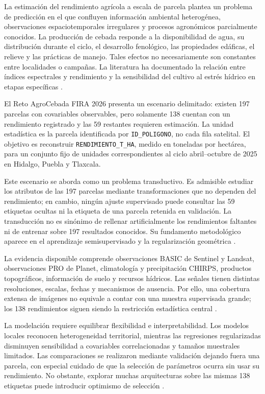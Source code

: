 La estimación del rendimiento agrícola a escala de parcela plantea un problema de predicción en el que confluyen información ambiental heterogénea, observaciones espaciotemporales irregulares y procesos agronómicos parcialmente conocidos. La producción de cebada responde a la disponibilidad de agua, su distribución durante el ciclo, el desarrollo fenológico, las propiedades edáficas, el relieve y las prácticas de manejo. Tales efectos no necesariamente son constantes entre localidades o campañas. La literatura ha documentado la relación entre índices espectrales y rendimiento y la sensibilidad del cultivo al estrés hídrico en etapas específicas \parencite{Mirosavljevic2018,Sharifi2020,Chanev2025,Hajkova2019,Bello2022,Mogensen1980,Zhang2015,King2024}.

El Reto AgroCebada FIRA 2026 presenta un escenario delimitado: existen 197 parcelas con covariables observables, pero solamente 138 cuentan con un rendimiento registrado y las 59 restantes requieren estimación. La unidad estadística es la parcela identificada por \texttt{ID\_POLIGONO}, no cada fila satelital. El objetivo es reconstruir \texttt{RENDIMIENTO\_T\_HA}, medido en toneladas por hectárea, para un conjunto fijo de unidades correspondientes al ciclo abril--octubre de 2025 en Hidalgo, Puebla y Tlaxcala.

Este escenario se aborda como un problema transductivo. Es admisible estudiar los atributos de las 197 parcelas mediante transformaciones que no dependen del rendimiento; en cambio, ningún ajuste supervisado puede consultar las 59 etiquetas ocultas ni la etiqueta de una parcela retenida en validación. La transducción no es sinónimo de rellenar artificialmente los rendimientos faltantes ni de entrenar sobre 197 resultados conocidos. Su fundamento metodológico aparece en el aprendizaje semisupervisado y la regularización geométrica \parencite{Chapelle2006,Belkin2006,Zhou2004}.

La evidencia disponible comprende observaciones BASIC de Sentinel y Landsat, observaciones PRO de Planet, climatología y precipitación CHIRPS, productos topográficos, información de suelo y recursos hídricos. Las señales tienen distintas resoluciones, escalas, fechas y mecanismos de ausencia. Por ello, una cobertura extensa de imágenes no equivale a contar con una muestra supervisada grande; los 138 rendimientos siguen siendo la restricción estadística central \parencite{Funk2015CHIRPS,Poggio2021SoilGrids,INEGICEM,FAOWaPOR,SIAPDatos}.

La modelación requiere equilibrar flexibilidad e interpretabilidad. Los modelos locales reconocen heterogeneidad territorial, mientras las regresiones regularizadas disminuyen sensibilidad a covariables correlacionadas y tamaños muestrales limitados. Las comparaciones se realizaron mediante validación dejando fuera una parcela, con especial cuidado de que la selección de parámetros ocurra sin usar su rendimiento. No obstante, explorar muchas arquitecturas sobre las mismas 138 etiquetas puede introducir optimismo de selección \parencite{Stone1974,HoerlKennard1970}.

